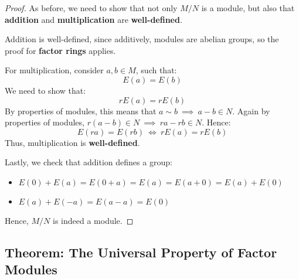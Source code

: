 \documentclass{exam}
\begin{document}
\begin{proof}

As before, we need to show that not only $M/N$ is a module, but also that \textbf{addition} and \textbf{multiplication} are \textbf{well-defined}.

\bigskip

Addition is well-defined, since additively, modules are abelian groups, so the proof for \textbf{factor rings} applies.

\bigskip

For multiplication, consider $a,b \in M$, such that:
\[
E(a) = E(b)
\]
We need to show that:
\[
rE(a) = rE(b)
\]
By properties of modules, this means that $a \sim b \ \implies \ a-b \in N$. Again by properties of modules, $r(a-b) \in N \ \implies \ ra - rb \in N$. Hence:
\[
E(ra) = E(rb) \ \iff \ rE(a) = rE(b)
\]
Thus, multiplication is \textbf{well-defined}.

\bigskip

Lastly, we check that addition defines a group:
\begin{itemize}
    \item $E(0) + E(a) = E(0 + a) = E(a) = E(a + 0) = E(a) + E(0)$
    \item $E(a) + E(-a) = E(a - a) = E(0)$
\end{itemize}

Hence, $M/N$ is indeed a module.

\end{proof}

\subsection{Theorem: The Universal Property of Factor Modules}

\end{document}
